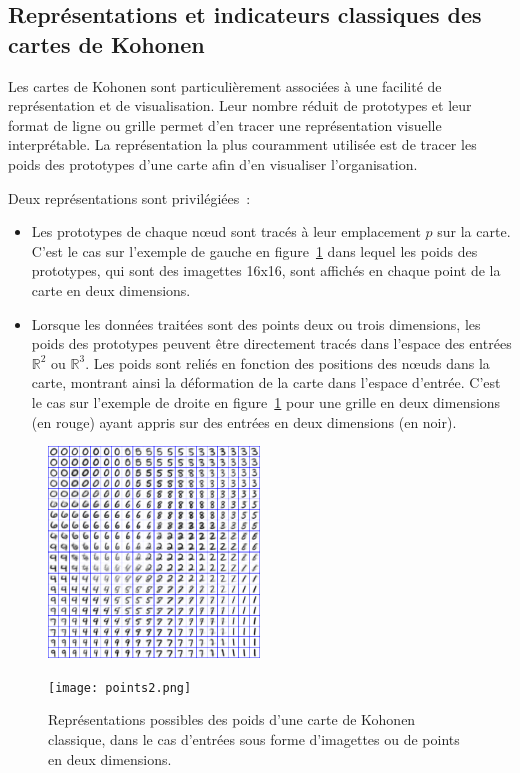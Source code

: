 \documentclass[../main]{subfiles}
\begin{document}
\subsection{Représentations et indicateurs classiques des cartes de Kohonen}

Les cartes de Kohonen sont particulièrement associées à une facilité de représentation et de visualisation. Leur nombre réduit de prototypes et leur format de ligne ou grille permet d'en tracer une représentation visuelle interprétable.
La représentation la plus couramment utilisée est de tracer les poids des prototypes d'une carte afin d'en visualiser l'organisation.

Deux représentations sont privilégiées~:
\begin{itemize}
\item Les prototypes de chaque n\oe{}ud sont tracés à leur emplacement $p$ sur la carte. 
C'est le cas sur l'exemple de gauche en figure~\ref{fig:representation} dans lequel les poids des prototypes, qui sont des imagettes 16x16, sont affichés en chaque point de la carte en deux dimensions.
\item Lorsque les données traitées sont des points deux ou trois dimensions, les poids des prototypes peuvent être directement tracés dans l'espace des entrées $\mathbb{R}^2$ ou $\mathbb{R}^3$. Les poids sont reliés en fonction des positions des n\oe{}uds dans la carte, montrant ainsi la déformation de la carte dans l'espace d'entrée. C'est le cas sur l'exemple de droite en figure~\ref{fig:representation} pour une grille en deux dimensions (en rouge) ayant appris sur des entrées en deux dimensions (en noir).
\end{itemize}

\begin{figure}
\begin{minipage}{0.5\textwidth}
\centering
\includegraphics[width=0.5\textwidth]{digits.jpg}
\end{minipage}
\begin{minipage}{0.5\textwidth}
\centering
\texttt{[image: points2.png]}
\end{minipage}
\caption[Représentations classiques des poids d'une carte de Kohonen]{\label{fig:representation} Représentations possibles des poids d'une carte de Kohonen classique, dans le cas d'entrées sous forme d'imagettes ou de points en deux dimensions.\footnotemark}
\end{figure}
\end{document}
